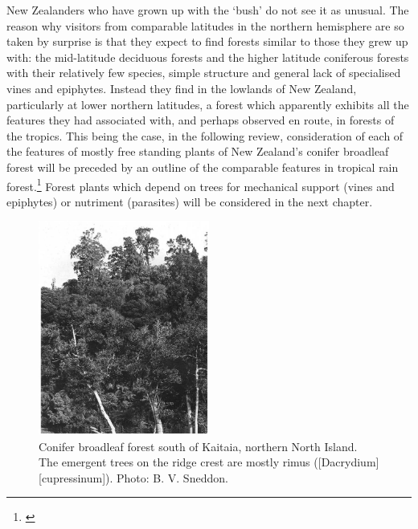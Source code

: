 New Zealanders who have grown up with the `bush' do not see it as unusual.
The reason why visitors from comparable latitudes in the northern hemisphere are so taken by surprise is that they expect to find forests similar to those they grew up with: the mid-latitude deciduous forests and the higher latitude coniferous forests with their relatively few species, simple structure and general lack of specialised vines and epiphytes.
Instead they find in the lowlands of New Zealand, particularly at lower northern latitudes, a forest which apparently exhibits all the features they had associated with, and perhaps observed en route, in forests of the tropics.
This being the case, in the following review, consideration of each of the features of mostly free standing plants of New Zealand's conifer broadleaf forest will be preceded by an outline of the comparable features in tropical rain forest.\footnote{\cite{richards1952tropical}}
Forest plants which depend on trees for mechanical support (vines and epiphytes) or nutriment (parasites) will be considered in the next chapter.

\begin{figure}
	\includegraphics[width=0.5\textwidth]{graphics/figure7conifer.jpg}
	\centering
	\caption[Conifer broadleaf forest south of Kaitaia]{Conifer broadleaf forest south of Kaitaia, northern North Island.
The emergent trees on the ridge crest are mostly rimus ([Dacrydium][cupressinum]).
	Photo: B. V. Sneddon.}%
	\label{fig:7conifer}
\end{figure}


